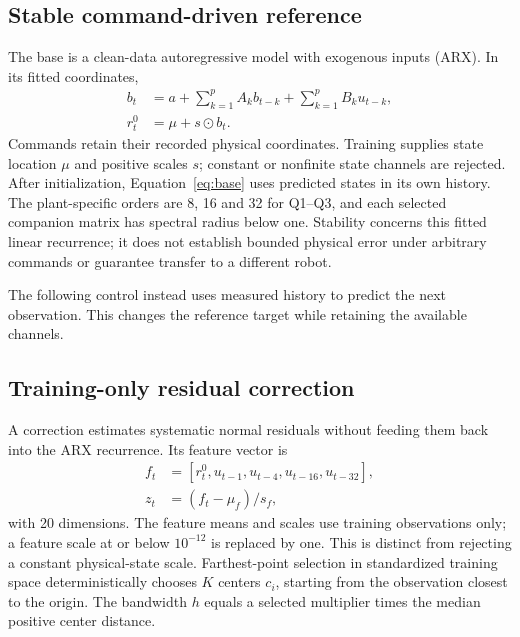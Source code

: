 \subsection{Stable command-driven reference}
The base is a clean-data autoregressive model with exogenous inputs (ARX). In its fitted coordinates,
\begin{align}
 b_t&=a+\sum_{k=1}^{p}A_k b_{t-k}+\sum_{k=1}^{p}B_k u_{t-k},\label{eq:base}\\
 r_t^0&=\mu+s\odot b_t .
\end{align}
Commands retain their recorded physical coordinates. Training supplies state location $\mu$ and positive scales $s$; constant or nonfinite state channels are rejected. After initialization, Equation~\ref{eq:base} uses predicted states in its own history. The plant-specific orders are 8, 16 and 32 for Q1--Q3, and each selected companion matrix has spectral radius below one. Stability concerns this fitted linear recurrence; it does not establish bounded physical error under arbitrary commands or guarantee transfer to a different robot.

The following control instead uses measured history to predict the next observation. This changes the reference target while retaining the available channels.

\subsection{Training-only residual correction}
A correction estimates systematic normal residuals without feeding them back into the ARX recurrence. Its feature vector is
\begin{align}
 f_t&=[r_t^0,u_{t-1},u_{t-4},u_{t-16},u_{t-32}],\\
 z_t&=(f_t-\mu_f)/s_f,\label{eq:features}
\end{align}
with 20 dimensions. The feature means and scales use training observations only; a feature scale at or below $10^{-12}$ is replaced by one. This is distinct from rejecting a constant physical-state scale. Farthest-point selection in standardized training space deterministically chooses $K$ centers $c_i$, starting from the observation closest to the origin. The bandwidth $h$ equals a selected multiplier times the median positive center distance.

